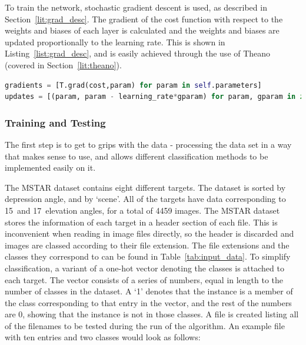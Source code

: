 To train the network, stochastic gradient descent is used, as described in Section~\ref{lit:grad_desc}. The gradient of the cost function with respect to the weights and biases of each layer is calculated and the weights and biases are updated proportionally to the learning rate. This is shown in Listing~\ref{list:grad_desc}, and is easily achieved through the use of Theano (covered in Section~\ref{lit:theano}).

\begin{lstlisting}[language=Python, caption=Implementing Gradient Descent, captionpos=b, label={list:grad_desc}]
gradients = [T.grad(cost,param) for param in self.parameters]
updates = [(param, param - learning_rate*gparam) for param, gparam in zip(parameters,gradients)]
\end{lstlisting}


\subsubsection{Training and Testing}
The first step is to get to grips with the data - processing the data set in a way that makes sense to use, and allows different classification methods to be implemented easily on it.

The MSTAR dataset contains eight different targets. The dataset is sorted by depression angle, and by `scene'. All of the targets have data corresponding to  15\degree~and 17\degree~elevation angles, for a total of 4459 images. The MSTAR dataset stores the information of each target in a header section of each file. This is inconvenient when reading in image files directly, so the header is discarded and images are classed according to their file extension. The file extensions and the classes they correspond to can be found in Table~\ref{tab:input_data}. To simplify classification, a variant of a one-hot vector denoting the classes is attached to each target. The vector consists of a series of numbers, equal in length to the number of classes in the dataset. A `1' denotes that the instance is a member of the class corresponding to that entry in the vector, and the rest of the numbers are 0, showing that the instance is not in those classes. A file is created listing all of the filenames to be tested during the run of the algorithm. An example file with ten entries and two classes would look as follows:\\


